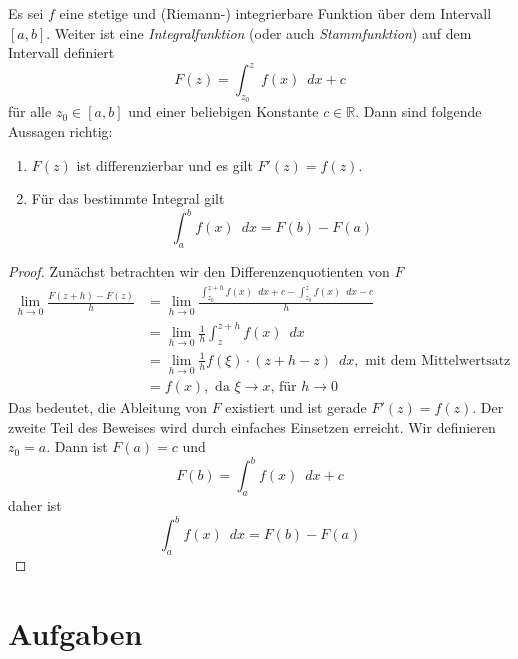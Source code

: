 \begin{satz}
Es sei $f$ eine stetige und (Riemann-) integrierbare Funktion über dem Intervall $[a,b]$. Weiter ist eine \emph{Integralfunktion} (oder auch \emph{Stammfunktion}) auf dem Intervall definiert
\begin{equation}
F(z) = \int_{z_0}^z f(x) \enspace dx + c
\end{equation}
für alle $z_0 \in [a,b]$ und einer beliebigen Konstante $c\in \mathbb{R}$. Dann sind folgende Aussagen richtig:

\begin{enumerate}
\item $F(z)$ ist differenzierbar und es gilt $F'(z) = f(z)$.
\item Für das bestimmte Integral gilt \begin{equation}
\int_a^b f(x) \enspace dx = F(b)-F(a)
\end{equation}
\end{enumerate}
\end{satz}
\begin{proof}
Zunächst betrachten wir den Differenzenquotienten von $F$
\begin{equation}
\begin{split}
\lim_{h\rightarrow 0} \frac{F(z+h)-F(z)}{h} &= \lim_{h\rightarrow 0} \frac{\int_{z_0}^{z+h} f(x)\enspace dx+c - \int_{z_0}^{z} f(x)\enspace dx-c}{h} \\
&= \lim_{h\rightarrow 0}\frac{1}{h} \int_{z}^{z+h} f(x)\enspace dx \\
&= \lim_{h\rightarrow 0}\frac{1}{h} f(\xi)\cdot (z+h-z)\enspace dx, \text{ mit dem Mittelwertsatz} \\
&= f(x), \text{ da }\xi \rightarrow x\text{, für }h\rightarrow 0
\end{split}
\end{equation}
Das bedeutet, die Ableitung von $F$ existiert und ist gerade $F'(z)=f(z)$. Der zweite Teil des Beweises wird durch einfaches Einsetzen erreicht. Wir definieren $z_0 = a$. Dann ist $F(a)=c$ und
\begin{equation*}
F(b) = \int_a^b f(x) \enspace dx +c
\end{equation*}
daher ist
\begin{equation}
\int_a^b f(x) \enspace dx = F(b)-F(a)
\end{equation}
\end{proof}


\section{Aufgaben}
